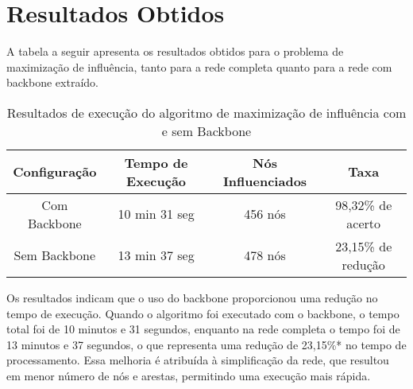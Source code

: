 \documentclass[12pt]{article}
\begin{document}

\section{Resultados Obtidos}

A tabela a seguir apresenta os resultados obtidos para o problema de maximização de influência, tanto para a rede completa quanto para a rede com backbone extraído.

\begin{table}[ht]
\centering
\begin{tabular}{|c|c|c|c|}
\hline
\textbf{Configuração} & \textbf{Tempo de Execução} & \textbf{Nós Influenciados} & \textbf{Taxa} \\ \hline
Com Backbone           & 10 min 31 seg              & 456 nós                    & 98,32\%  de acerto               \\ \hline
Sem Backbone           & 13 min 37 seg              & 478 nós                    & 23,15\% de redução                       \\ \hline
\end{tabular}
\caption{Resultados de execução do algoritmo de maximização de influência com e sem Backbone}
\end{table}

Os resultados indicam que o uso do backbone proporcionou uma redução no tempo de execução. Quando o algoritmo foi executado com o backbone, o tempo total foi de 10 minutos e 31 segundos, enquanto na rede completa o tempo foi de 13 minutos e 37 segundos, o que representa uma redução de 23,15\%* no tempo de processamento. Essa melhoria é atribuída à simplificação da rede, que resultou em menor número de nós e arestas, permitindo uma execução mais rápida.
\end{document}
